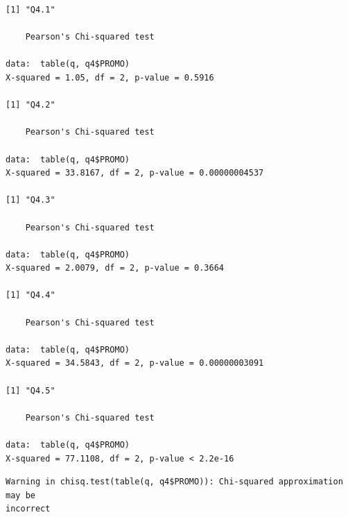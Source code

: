 \documentclass[]{article}
\begin{document}
\begin{verbatim}
[1] "Q4.1"

    Pearson's Chi-squared test

data:  table(q, q4$PROMO)
X-squared = 1.05, df = 2, p-value = 0.5916

[1] "Q4.2"

    Pearson's Chi-squared test

data:  table(q, q4$PROMO)
X-squared = 33.8167, df = 2, p-value = 0.00000004537

[1] "Q4.3"

    Pearson's Chi-squared test

data:  table(q, q4$PROMO)
X-squared = 2.0079, df = 2, p-value = 0.3664

[1] "Q4.4"

    Pearson's Chi-squared test

data:  table(q, q4$PROMO)
X-squared = 34.5843, df = 2, p-value = 0.00000003091

[1] "Q4.5"

    Pearson's Chi-squared test

data:  table(q, q4$PROMO)
X-squared = 77.1108, df = 2, p-value < 2.2e-16
\end{verbatim}

\begin{verbatim}
Warning in chisq.test(table(q, q4$PROMO)): Chi-squared approximation may be
incorrect
\end{verbatim}
\end{document}
